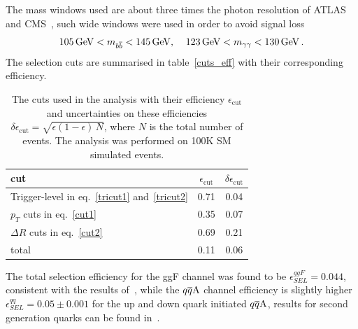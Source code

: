 The mass windows used are about three times the photon resolution of ATLAS and CMS~\cite{ATL-PHYS-PUB-2013-009,CMS:2013aoa}, such wide windows were used in order to avoid signal loss
\begin{equation}
	105\,\GeV < m_{b \bar b} < 145 \, \GeV, \; \; \; \;123\, \GeV < m_{\gamma \gamma} < 130 \, \GeV\,.
	\label{cut3}
\end{equation}
The selection cuts are summarised in table~\autoref{cuts_eff} with their corresponding efficiency. 
\begin{table}[!t]
	\centering
	\begin{tabular}{l cc }
		\toprule
		cut  & $\epsilon_{\mathrm{cut}}$  &  $ \delta \epsilon_{\mathrm{cut}}$ \\
		\midrule
		Trigger-level in eq.~\eqref{tricut1} and~\eqref{tricut2} &0.71 & 0.04 \\
		$p_T$ cuts in eq.~\eqref{cut1} & 0.35 & 0.07\\
		$\Delta R$ cuts  in eq.~\eqref{cut2} & 0.69 & 0.21 \\
		\hline
		total    & 0.11 & 0.06 \\
		\bottomrule
	\end{tabular}
	\caption{The cuts used in the analysis with their efficiency $\epsilon_{\mathrm{cut}}$ and uncertainties on these efficiencies $ \delta \epsilon_{\mathrm{cut}} = \sqrt{\epsilon(1-\epsilon)\,N}$, where $N$ is the total number of events. The analysis was performed on 100K SM simulated events. }
	\label{cuts_eff}
\end{table}
%
The total selection efficiency for the ggF channel was found to be $\epsilon^{ggF}_{SEL} = 0.044$, consistent with the results of~\cite{Azatov:2015oxa}, while the $q\overline q \rm A$ channel efficiency is slightly higher $\epsilon^{qq}_{SEL} = 0.05 \pm 0.001$ for the up and down quark initiated $ q\overline q \rm A$, results for second generation quarks can be found in~\cite{Alasfar:2019pmn}.
